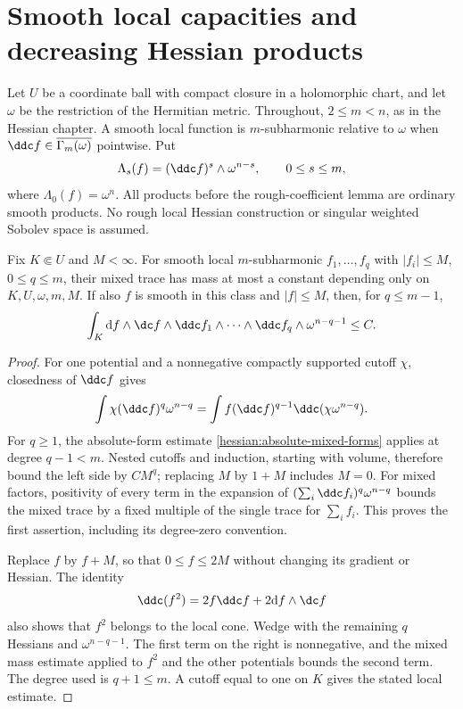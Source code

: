\section{Smooth local capacities and decreasing Hessian products}

Let $U$ be a coordinate ball with compact closure in a holomorphic
chart, and let $\omega$ be the restriction of the Hermitian metric.
Throughout, $2\leq m<n$, as in the Hessian chapter. A smooth local function is
$m$-subharmonic relative to $\omega$ when
$\ddc f\in\overline{\Gamma_m(\omega)}$ pointwise. Put
\[
 \Lambda_s(f)=(\ddc f)^s\wedge\omega^{n-s},\qquad 0\leq s\leq m,
\]
where $\Lambda_0(f)=\omega^n$. All products before the rough-coefficient lemma are
ordinary smooth products. No rough local Hessian construction or
singular weighted Sobolev space is assumed.

\begin{lemma}\label{draft621:local-smooth-bounds}
Fix $K\Subset U$ and $M<\infty$. For smooth local $m$-subharmonic
$f_1,\ldots,f_q$ with $|f_i|\leq M$, $0\leq q\leq m$, their mixed
trace has mass at most a constant depending only on $K,U,\omega,m,M$.
If also $f$ is smooth in this class and $|f|\leq M$, then, for
$q\leq m-1$,
\[
 \int_K\mathrm df\wedge\dc f\wedge
       \ddc f_1\wedge\cdots\wedge\ddc f_q
                         \wedge\omega^{n-q-1}\leq C.
\]
\end{lemma}
\begin{proof}
For one potential and a nonnegative compactly supported cutoff $\chi$,
closedness of $\ddc f$ gives
\[
 \int\chi(\ddc f)^q\omega^{n-q}
       =\int f(\ddc f)^{q-1}\ddc(\chi\omega^{n-q}).
\]
For $q\geq1$, the absolute-form estimate
\cref{hessian:absolute-mixed-forms} applies at degree $q-1<m$.
Nested cutoffs and induction, starting with volume, therefore bound
the left side by $C M^q$; replacing $M$ by $1+M$ includes $M=0$.
For mixed factors, positivity of every term in the expansion of
$(\sum_i\ddc f_i)^q\omega^{n-q}$ bounds the mixed trace by a fixed
multiple of the single trace for $\sum_i f_i$. This proves the first
assertion, including its degree-zero convention.

Replace $f$ by $f+M$, so that $0\leq f\leq2M$ without changing its
gradient or Hessian. The identity
\[
 \ddc(f^2)=2f\ddc f+2\mathrm df\wedge\dc f
\]
also shows that $f^2$ belongs to the local cone. Wedge with the
remaining $q$ Hessians and $\omega^{n-q-1}$. The first term on the
right is nonnegative, and the mixed mass estimate applied to $f^2$
and the other potentials bounds the second term. The degree used is
$q+1\leq m$. A cutoff equal to one on $K$ gives the stated local
estimate.
\end{proof}

